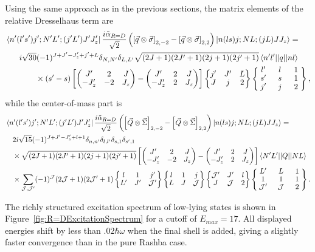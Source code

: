 \documentclass[%
 notitlepage,
 preprint,
showpacs,%
 amsmath,amssymb,
 aps,
pra,
]{revtex4-1}
\newcommand{\threej}[6]{ \begin{pmatrix}
  #1 & #2 & #3 \\
  #4 & #5 & #6 
 \end{pmatrix}}
\newcommand{\sixj}[6]{ \begin{Bmatrix}
  #1 & #2 & #3 \\
  #4 & #5 & #6 
 \end{Bmatrix}}
\newcommand{\ninej}[9]{ \begin{Bmatrix}
  #1 & #2 & #3 \\
  #4 & #5 & #6 \\
  #7 & #8 & #9
 \end{Bmatrix}}
\begin{document}
Using the same approach as in the previous sections, the matrix elements of the relative Dresselhaus term are
\begin{equation}\begin{split}
&\bra{n'(l's')j';N'L';(j'L')J'J'_z} \frac{i \tilde{\alpha}_{R=D}}{\sqrt{2}}\left(  \left[ \vec{q} \otimes \vec{\sigma} \right]_{2,-2} -  \left[ \vec{q} \otimes \vec{\sigma} \right]_{2,2} \right)  \ket{n(ls)j;NL;(jL)JJ_z} = \\
 &\quad\hphantom{\times} i \sqrt{30}(-1)^{J+J'-J'_z+j'+L}\delta_{N,N'}\delta_{L,L'} \sqrt{(2J+1)(2J'+1)(2j+1)(2j'+1)}  \braket{n'l' || q || n l}\\
 &\hspace{1cm}\quad \times(s'-s) \left[\threej{J'}{2}{J}{-J'_z}{-2}{J_z}-\threej{J'}{2}{J}{-J'_z}{2}{J_z}\right] \sixj{j'}{J'}{L}{J}{j}{2}
 \renewcommand{\arraystretch}{0.9} \ninej{\hphantom{l}l'\hphantom{l}}{\hphantom{l}l\hphantom{l}}{\hphantom{l}1\hphantom{l}}{s'}{s}{1}{j'}{j}{2},
\end{split}
\end{equation}
while the center-of-mass part is 
\begin{equation}\begin{split}
&\bra{n'(l's')j';N'L';(j'L')J'J'_z}  \frac{i \tilde{\alpha}_{R=D}}{\sqrt{2}}\left(  \left[ \vec{Q} \otimes \vec{\Sigma} \right]_{2,-2} -  \left[ \vec{Q} \otimes \vec{\Sigma} \right]_{2,2} \right)  \ket{n(ls)j;NL;(jL)JJ_z} =  \\
&\quad2 i \sqrt{15}(-1)^{J+J'-J'_z+l+1}\delta_{n,n'}\delta_{l,l'}\delta_{s,1}\delta_{s',1}  \\
 &\quad\times \sqrt{(2J+1)(2J'+1)(2j+1)(2j'+1)} \left[\threej{J'}{2}{J}{-J'_z}{-2}{J_z}-\threej{J'}{2}{J}{-J'_z}{2}{J_z}\right] \braket{N' L' || Q || N L} \\ 
 &\quad\times\sum_{\mathcal{J},\mathcal{J}'} (-1)^\mathcal{J}(2\mathcal{J}+1)(2\mathcal{J}'+1)\sixj{l}{1}{j'}{L'}{J'}{\mathcal{J}'}\sixj{l}{1}{j}{L}{J}{\mathcal{J}}\sixj{\mathcal{J}'}{J'}{l}{J}{\mathcal{J}}{2}
 \renewcommand{\arraystretch}{0.9}
 \ninej{\hphantom{l}L'\hphantom{l}}{\hphantom{l}L\hphantom{l}}{\hphantom{l}1\hphantom{l}}{1}{1}{1}{\mathcal{J}'}{\mathcal{J}}{2} .
\end{split}
\end{equation}

The richly structured excitation spectrum of low-lying states is shown in Figure~\ref{fig:R=DExcitationSpectrum} for a cutoff of $E_{max}=17$. All displayed energies shift by less than .$02\hbar\omega$ when the final shell is added, giving a slightly faster convergence than in the pure Rashba case.
\end{document}

